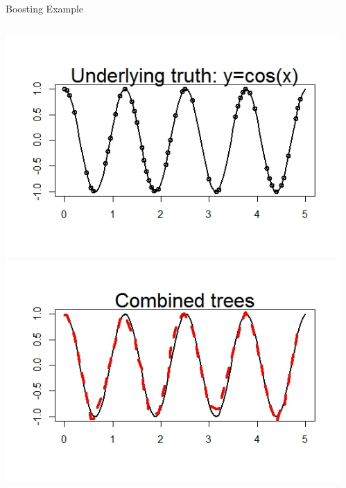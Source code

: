 \documentclass{beamer}
\begin{document}
	\begin{frame}{Boosting Example}
		\begin{columns}
			\begin{column}{0.5\textwidth}
					\includegraphics[scale=0.35]{data.jpeg}\\
					\includegraphics[scale=0.35]{combine.jpeg}\\
			\end{column}
			\begin{column}{0.6\textwidth}

\end{column}
\end{columns}
\end{frame}
\end{document}

